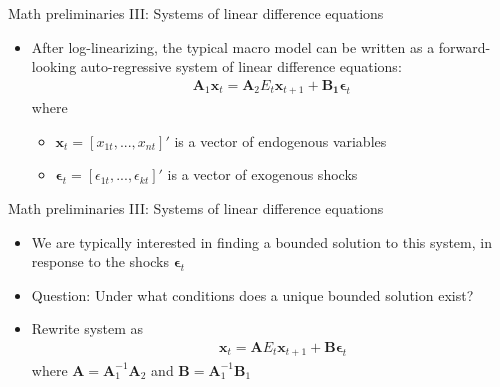 \documentclass[9pt,xcolor={dvipsnames}]{beamer}
\newcommand{\bit}{\begin{itemize}}
\newcommand{\eit}{\end{itemize}}
\newcommand{\bc}{\color{blue}}
\begin{document}
\begin{frame}{Math preliminaries III: Systems of linear difference equations}

\bit
\setlength\itemsep{2em}

\item After log-linearizing, the typical macro model can be written as a {\bc forward-looking auto-regressive system} of {\bc linear difference equations}:
\begin{eqnarray}
\mathbf A_1 \mathbf{x}_{t} = \mathbf A_2 E_t \mathbf x_{t+1} + \mathbf {B_1} \mathbf \epsilon_t \nonumber
\end{eqnarray}
where 
\bit
	\item $\mathbf{x}_{t} = [x_{1t}, ..., x_{nt}]'$ is a vector of endogenous variables
	\item $\mathbf{\epsilon}_{t} = [\epsilon_{1t}, ..., \epsilon_{kt}]'$ is a vector of exogenous shocks
\eit

\eit

\end{frame}

\begin{frame}{Math preliminaries III: Systems of linear difference equations}

\bit
\setlength\itemsep{2em}

\item We are typically interested in finding a {\bc bounded} solution to this system, in response to the shocks $\mathbf{\epsilon}_t$

\item Question: Under what conditions does a {\bc unique bounded solution} exist?

\item Rewrite system as
\begin{eqnarray}
&& \mathbf{x}_{t} = \mathbf A E_t \mathbf x_{t+1} + \mathbf {B} \mathbf {\epsilon}_t \nonumber
\end{eqnarray}
where $\mathbf A = \mathbf A_1^{-1} \mathbf A_2$ and $\mathbf B = \mathbf A_1^{-1} \mathbf B_1$ 

\eit

\end{frame}
\end{document}
